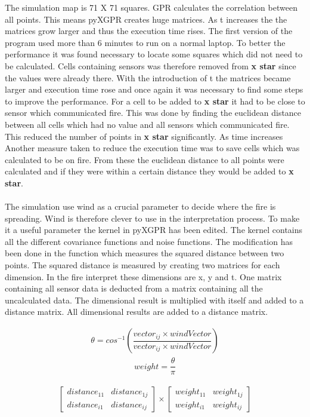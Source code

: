 The simulation map is 71 X 71 squares. GPR calculates the correlation between all points. This means pyXGPR creates huge matrices. As t increases the the matrices grow larger and thus the execution time rises. The first version of the program used more than 6 minutes to run on a normal laptop. To better the performance it was found necessary to locate some squares which did not need to be calculated. Cells containing sensors was therefore removed from \textbf{x star} since the values were already there. With the introduction of t the matrices became larger and execution time rose and once again it was necessary to find some steps to improve the performance. For a cell to be added to \textbf{x star} it had to be close to sensor which communicated fire. This was done by finding the euclidean distance between all cells which had no value and all sensors which communicated fire. This reduced the number of points in \textbf{x star} significantly. As time increases Another measure taken to reduce the execution time was to save cells which was calculated to be on fire. From these the euclidean distance to all points were calculated and if they were within a certain distance they would be added to \textbf{x star}.
\\\\
The simulation use wind as a crucial parameter to decide where the fire is spreading. Wind is therefore clever to use in the interpretation process. To make it a useful parameter the kernel in pyXGPR has been edited. The kernel contains all the different covariance functions and noise functions. The modification has been done in the function which measures the squared distance between two points. The squared distance is measured by creating two matrices for each dimension. In the fire interpret these dimensions are x, y and t. One matrix containing all sensor data is deducted from a matrix containing all the uncalculated data. The dimensional result is multiplied with itself and added to a distance matrix. All dimensional results are added to a distance matrix. 

\begin{eqnarray}
\theta = cos^{-1}\left(\dfrac{vector_{ij} \times windVector}{vector_{ij} \times windVector } \right) 
\label{eq:int-angle}
\end{eqnarray}
\begin{eqnarray}
weight = \dfrac{\theta}{\pi}
\label{eq:weight}
\end{eqnarray}

\begin{eqnarray}
\begin{bmatrix} distance_{11} & distance_{1j} \\ distance_{i1} & distance_{ij} \end{bmatrix} \times 
\begin{bmatrix} weight_{11} & weight_{1j} \\ weight_{i1} & weight_{ij} \end{bmatrix}
\label{eq:hadamard}
\end{eqnarray}


